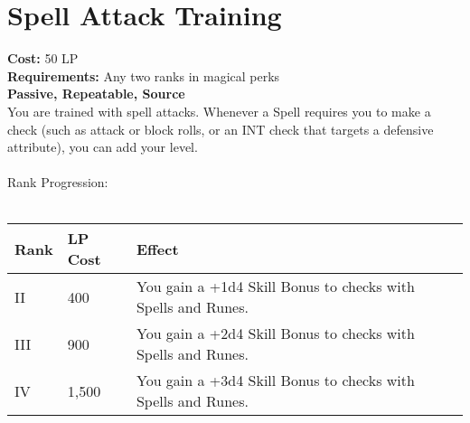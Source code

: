 \section{Spell Attack Training}\label{perk:spellAttackTraining}
\textbf{Cost:} 50 LP\\
\textbf{Requirements:} Any two ranks in magical perks\\
\textbf{Passive, Repeatable, Source}\\
You are trained with spell attacks.
Whenever a Spell requires you to make a check (such as attack or block rolls, or an INT check that targets a defensive attribute), you can add your level.\\
\\
Rank Progression:\\
\\
\begin{longtable}{l | l | p{9cm}}
	Rank & LP Cost & Effect\\
	\hline
	II & 400 & You gain a +1d4 Skill Bonus to checks with Spells and Runes.\\
	III & 900 & You gain a +2d4 Skill Bonus to checks with Spells and Runes.\\
	IV & 1,500 & You gain a +3d4 Skill Bonus to checks with Spells and Runes.\\
\end{longtable}